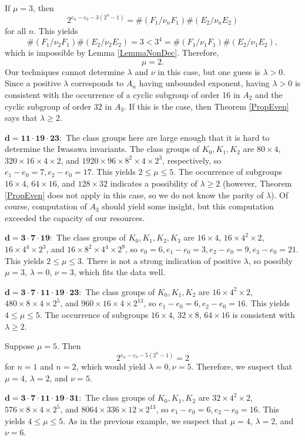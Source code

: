 \documentclass{amsart}
\begin{document}
If $\mu=3$, then
$$
2^{e_n-e_0-3(2^n-1)} = \#(F_1/\nu_n F_1)\#(E_2/\nu_n E_2)
$$
for all $n$. This yields 
$$
\#(F_1/\nu_2F_1)\#(E_2/\nu_2 E_2) = 3 < 3^4 = \#(F_1/\nu_1F_1)\#(E_2/\nu_1 E_2),
$$
which is impossible by Lemma \ref{LemmaNonDec}. Therefore,
$$\mu=2.$$
Our techniques cannot determine $\lambda$ and $\nu$ in this case, but one guess is
$\lambda >0$. Since a positive $\lambda$ corresponds to $A_n$ having unbounded exponent,
having $\lambda>0$ is consistent with the occurrence of a cyclic subgroup of order 16 in $A_2$ and the
cyclic subgroup of order 32 in $A_3$. If this is the case, then Theorem \ref{PropEven} says that $\lambda\ge 2$.


\medskip
\noindent
{$\mathbf{d=11\cdot 19\cdot 23:}$} The class groups here are large enough that it is hard to determine the Iwasawa invariants.
The class groups of $K_0, K_1, K_2$ are
$80\times 4$, $320\times 16\times 4\times 2$, and $1920\times 96\times 8^2\times 4\times 2^3$, respectively, so
$e_1-e_0= 7,  e_2-e_0 = 17$. This yields $2\le  \mu \le 5$.
The occurrence of subgroups $16\times 4$, $64\times 16$, and $128\times 32$ indicates a possibility of $\lambda \ge 2$
(however, Theorem \ref{PropEven} does not apply in this case, so we do not know the parity of $\lambda$).
Of course, computation of $A_3$ should yield some insight, but this computation exceeded the capacity of
our resources.

\medskip
\noindent
{$\mathbf{d=3\cdot 7\cdot 19:}$} The class groups of $K_0, K_1, K_2, K_3$ are
$16\times 4$, $16\times 4^2\times 2$, $16\times 4^4\times 2^3$, and $16\times 8^2\times 4^4\times 2^9$, so
$e_0=6, e_1-e_0=3, e_2-e_0=9, e_3-e_0=21$. This yields $2\le \mu\le 3$. There is not a strong indication of positive $\lambda$,
so possibly $\mu=3$, $\lambda=0$, $\nu=3$, which fits the data well.


\medskip
\noindent
{$\mathbf{d=3\cdot 7\cdot 11 \cdot 19\cdot 23:}$} The class groups of $K_0, K_1, K_2$ are
$16\times 4^2\times 2$, $480\times 8\times 4\times 2^5$, and $960\times 16\times 4\times 2^{13}$,
so      $e_1-e_0 = 6,   e_2-e_0 = 16$.
This yields $4\le \mu \le 5$. The occurrence of subgroups $16\times 4$, $32\times 8$, $64\times 16$
is consistent with $\lambda \ge 2$. 

Suppose $\mu=5$. Then 
$$
2^{e_n-e_0-5(2^n-1)} = 2
$$
for $n=1$ and $n=2$,
which would yield $\lambda=0, \nu = 5$. Therefore, we suspect that $\mu=4$, $\lambda = 2$, and $\nu=5$. 

\medskip
\noindent
{$\mathbf{d=3\cdot 7\cdot 11 \cdot 19\cdot 31:}$} The class groups of $K_0, K_1, K_2$ are
$32\times 4^2 \times 2$, $576\times 8\times 4\times 2^5$, and  $8064\times 336\times 12 \times 2^{13}$, so  
$e_1-e_0 = 6,   e_2-e_0 = 16$. This yields $4\le \mu \le 5$. As in the previous example,
we suspect that $\mu=4$, $\lambda = 2$, and $\nu=6$.
\end{document}
